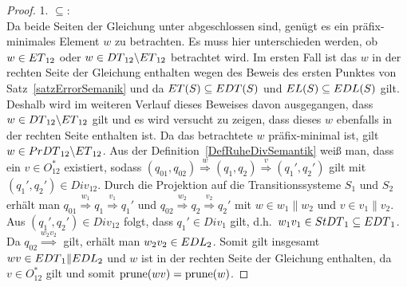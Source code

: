\begin{proof}

  1. \glqq{}$\subseteq$\grqq{}:\\
  Da beide Seiten der Gleichung unter \cont{} abgeschlossen sind, genügt es ein
  präfix-mini\-ma\-les Element $w$ zu betrachten. Es muss hier unterschieden werden, ob
  $w\in ET{}_{12}$ oder $w\in DT{}_{12}\backslash ET{}_{12}$ betrachtet
  wird. Im ersten Fall ist das $w$ in der rechten Seite der Gleichung
  enthalten wegen des Beweis des ersten Punktes von
  Satz~\ref{satzErrorSemanik} und da $ET{}(S)\subseteq EDT{}(S)$ und
  $EL{}(S)\subseteq EDL{}(S)$ gilt. Deshalb wird im weiteren Verlauf dieses
  Beweises
  davon ausgegangen, dass $w\in DT{}_{12}\backslash ET{}_{12}$ gilt und es
  wird versucht zu zeigen, dass dieses $w$ ebenfalls in der rechten Seite
  enthalten ist. Da das betrachtete $w$ präfix-minimal ist, gilt $w\in
  PrDT{}_{12}\backslash ET{}_{12}$. Aus der
  Definition~\ref{DefRuheDivSemantik} weiß man, dass ein $v\in O^*_{12}$
  existiert, sodass $(q_{01},q_{02}) \overset{w}{\Rightarrow} (q_1,q_2)
  \overset{v}{\Rightarrow} (q_1',q_2')$ gilt mit $(q_1',q_2')\in Div_{12}$.
  Durch die Projektion auf die Transitionssysteme $S_1$ und $S_2$ erhält man
  $q_{01} \overset{w_1}{\Rightarrow} q_1 \overset{v_1}{\Rightarrow} q_1'$ und
  $q_{02} \overset{w_2}{\Rightarrow} q_2 \overset{v_2}{\Rightarrow} q_2'$ mit
  $w\in w_1\|w_2$ und $v\in v_1\|v_2$. Aus $(q_1',q_2')\in Div_{12}$ folgt,
  dass \oBdA{} $q_1'\in Div_1$ gilt, d.h.\ $w_1v_1\in StDT{}_1\subseteq
  EDT{}_1$. Da $q_{02} \overset{w_2v_2}{\Longrightarrow}$ gilt, erhält man
  $w_2v_2\in EDL_2$. Somit gilt insgesamt $wv\in EDT{}_1\|EDL{}_2$ und $w$
  ist in der rechten Seite der Gleichung enthalten, da $v\in O_{12}^*$ gilt und
  somit $\mathrm{prune}{}(wv)=\mathrm{prune}{}(w)$.


\end{proof}
